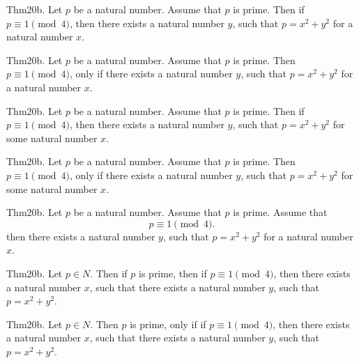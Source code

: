 \documentclass{article}
\begin{document}
Thm20b. Let $p$ be a natural number. Assume that $p$ is prime. Then if $p \equiv 1 \pmod{ 4}$, then there exists a natural number $y$, such that $p = x ^{ 2}+ y ^{ 2}$ for a natural number $x$.

Thm20b. Let $p$ be a natural number. Assume that $p$ is prime. Then $p \equiv 1 \pmod{ 4}$, only if there exists a natural number $y$, such that $p = x ^{ 2}+ y ^{ 2}$ for a natural number $x$.

Thm20b. Let $p$ be a natural number. Assume that $p$ is prime. Then if $p \equiv 1 \pmod{ 4}$, then there exists a natural number $y$, such that $p = x ^{ 2}+ y ^{ 2}$ for some natural number $x$.

Thm20b. Let $p$ be a natural number. Assume that $p$ is prime. Then $p \equiv 1 \pmod{ 4}$, only if there exists a natural number $y$, such that $p = x ^{ 2}+ y ^{ 2}$ for some natural number $x$.

Thm20b. Let $p$ be a natural number. Assume that $p$ is prime. Assume that $$p \equiv 1 \pmod{ 4}.$$ then there exists a natural number $y$, such that $p = x ^{ 2}+ y ^{ 2}$ for a natural number $x$.

Thm20b. Let $p \in N$. Then if $p$ is prime, then if $p \equiv 1 \pmod{ 4}$, then there exists a natural number $x$, such that there exists a natural number $y$, such that $p = x ^{ 2}+ y ^{ 2}$.

Thm20b. Let $p \in N$. Then $p$ is prime, only if if $p \equiv 1 \pmod{ 4}$, then there exists a natural number $x$, such that there exists a natural number $y$, such that $p = x ^{ 2}+ y ^{ 2}$.
\end{document}
